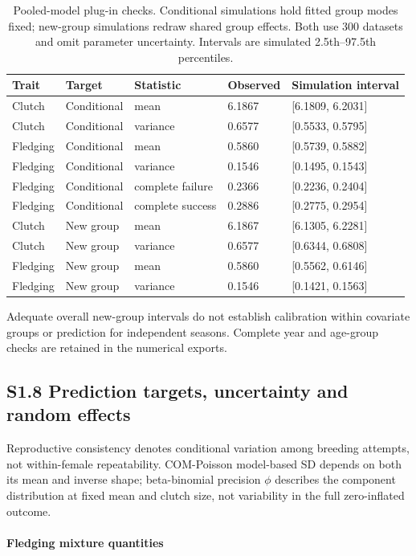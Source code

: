 \documentclass{article}
\begin{document}
\begin{table}[!ht]\centering\scriptsize\singlespacing
\caption{Pooled-model plug-in checks. Conditional simulations hold fitted group modes fixed; new-group simulations redraw shared group effects. Both use 300 datasets and omit parameter uncertainty. Intervals are simulated 2.5th--97.5th percentiles.}\label{tab:revised-checks}
\begin{tabular}{lllll}\toprule
Trait & Target & Statistic & Observed & Simulation interval\\\midrule
Clutch & Conditional & mean & 6.1867 & [6.1809, 6.2031]\\
Clutch & Conditional & variance & 0.6577 & [0.5533, 0.5795]\\
Fledging & Conditional & mean & 0.5860 & [0.5739, 0.5882]\\
Fledging & Conditional & variance & 0.1546 & [0.1495, 0.1543]\\
Fledging & Conditional & complete failure & 0.2366 & [0.2236, 0.2404]\\
Fledging & Conditional & complete success & 0.2886 & [0.2775, 0.2954]\\
Clutch & New group & mean & 6.1867 & [6.1305, 6.2281]\\
Clutch & New group & variance & 0.6577 & [0.6344, 0.6808]\\
Fledging & New group & mean & 0.5860 & [0.5562, 0.6146]\\
Fledging & New group & variance & 0.1546 & [0.1421, 0.1563]\\
\bottomrule\end{tabular}\end{table}
Adequate overall new-group intervals do not establish calibration within covariate groups or prediction for independent seasons. Complete year and age-group checks are retained in the numerical exports.

\subsection{S1.8 Prediction targets, uncertainty and random effects}

Reproductive consistency denotes conditional variation among breeding attempts, not within-female repeatability. COM-Poisson model-based SD depends on both its mean and inverse shape; beta-binomial precision $\phi$ describes the component distribution at fixed mean and clutch size, not variability in the full zero-inflated outcome.

\paragraph{Fledging mixture quantities}
\end{document}
